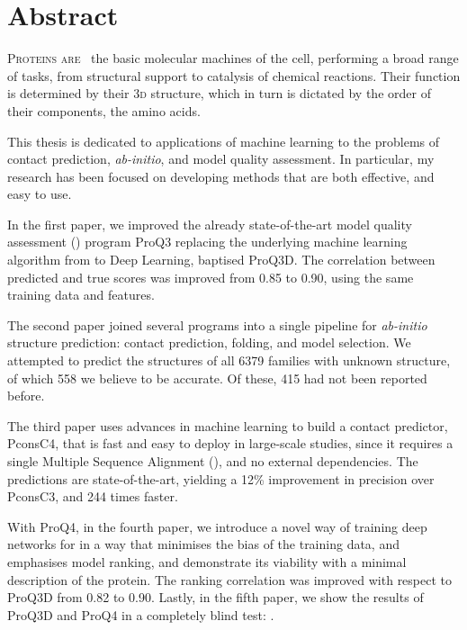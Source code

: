 \chapter*{Abstract}
\lettrine[lines=3, lhang=0.15, nindent=0em, findent=2pt]{\color{Maroon}P}{roteins are\ }
the basic molecular machines of the cell, performing a broad range of tasks, from structural support to catalysis of chemical reactions.
Their function is determined by their \textsc{3d} structure, which in turn is dictated by the order of their components, the amino acids.

This thesis is dedicated to applications of machine learning to the problems of contact prediction, \emph{ab-initio}, and model quality assessment.
In particular, my research has been focused on developing methods that are both effective, and easy to use.

In the first paper, we improved the already state-of-the-art model quality assessment (\MQA) program ProQ3 replacing the underlying machine learning algorithm from \SVM{} to Deep Learning, baptised ProQ3D.
The correlation between predicted and true scores was improved from 0.85 to 0.90, using the same training data and features.

The second paper joined several programs into a single pipeline for \emph{ab-initio} structure prediction: contact prediction, folding, and model selection.
We attempted to predict the structures of all 6379 \PFAM{} families with unknown structure, of which 558 we believe to be accurate.
Of these, 415 had not been reported before.

The third paper uses advances in machine learning to build a contact predictor, PconsC4, that is fast and easy to deploy in large-scale studies, since it requires a single Multiple Sequence Alignment (\MSA), and no external dependencies.
The predictions are state-of-the-art, yielding a 12\% improvement in precision over PconsC3, and 244 times faster.

With ProQ4, in the fourth paper, we introduce a novel way of training deep networks for \MQA{} in a way that minimises the bias of the training data, and emphasises model ranking, and demonstrate its viability with a minimal description of the protein.
The ranking correlation was improved with respect to ProQ3D from 0.82 to 0.90.
Lastly, in the fifth paper, we show the results of ProQ3D and ProQ4 in a completely blind test: .

